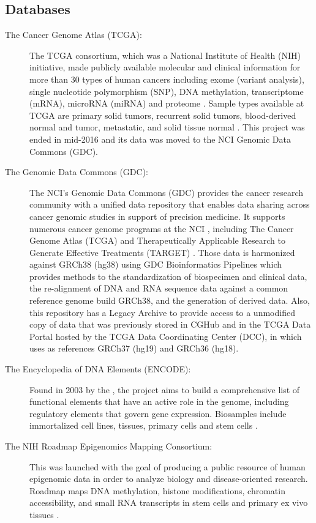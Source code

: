 \subsection{Databases} \label{susec:db}
\begin{description}
  \item [The Cancer Genome Atlas (TCGA):] The TCGA consortium, which was a National Institute of Health (NIH) initiative, made publicly available molecular and clinical information for more than 30 types of human cancers including exome (variant analysis), single nucleotide polymorphism (SNP), DNA methylation, transcriptome (mRNA), microRNA (miRNA) and proteome . Sample types available at TCGA are primary solid tumors, recurrent solid tumors, blood-derived normal and tumor, metastatic, and solid tissue normal \cite{weinstein2013cancer}. This project was ended in mid-2016 and its data was moved to  the NCI Genomic Data Commons (GDC).
  \item [The Genomic Data Commons (GDC):]  The NCI's Genomic Data Commons (GDC) provides the cancer research community with a unified data repository that enables data sharing across cancer genomic studies in support of precision medicine.
  It supports numerous cancer genome programs at the NCI , including The Cancer Genome Atlas (TCGA) and Therapeutically Applicable Research to Generate Effective Treatments (TARGET) \cite{GDC_web}.
  Those data is harmonized against GRCh38 (hg38) using GDC Bioinformatics Pipelines which provides methods to the standardization of biospecimen and clinical data, the re-alignment of DNA and RNA sequence data against a common reference genome build GRCh38, and the generation of derived data. Also, this repository has a Legacy Archive to provide access to a unmodified copy of data that was previously stored in CGHub \cite{wilks2014cancer} and in the TCGA Data Portal hosted by the TCGA Data Coordinating Center (DCC), in which uses as references GRCh37 (hg19) and GRCh36 (hg18).
  \item [The Encyclopedia of DNA Elements (ENCODE):] Found in 2003 by the , the project aims to build a comprehensive list of functional elements that have an active role in the genome, including regulatory elements that govern gene expression. Biosamples include immortalized cell lines, tissues, primary cells and stem cells \cite{encode2011user}.
  \item [The NIH Roadmap Epigenomics Mapping Consortium:] This was launched with the goal of producing a public resource of human epigenomic data in order to analyze biology and disease-oriented research. Roadmap maps DNA methylation, histone modifications, chromatin accessibility, and small RNA transcripts in stem cells and primary ex vivo tissues
  \cite{Fingerman,Bernstein}.
\end{description}

